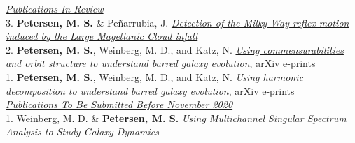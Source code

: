 \documentclass[margin, a4paper,11pt]{res} %
\begin{document}
\begin{resume}
\underline{\sl Publications In Review} \\
3. {\bf \textcolor{blueshade}{Petersen, M. S.}} \& Pe{\~n}arrubia, J.  \href{https://michael-petersen.github.io}{\it Detection of the Milky Way reflex motion induced by the Large Magellanic Cloud infall}\\
2. {\bf \textcolor{blueshade}{Petersen, M. S.}}, Weinberg, M. D., and Katz, N. \href{https://ui.adsabs.harvard.edu/abs/2019arXiv190205081P/abstract}{\it Using commensurabilities and orbit structure to understand barred galaxy evolution}, arXiv e-prints\\
1. {\bf \textcolor{blueshade}{Petersen, M. S.}}, Weinberg, M. D., and Katz, N. \href{https://ui.adsabs.harvard.edu/abs/2019arXiv190308203P/abstract}{\it Using harmonic decomposition to understand barred galaxy evolution}, arXiv e-prints\\

\underline{\sl Publications To Be Submitted Before November 2020} \\
1. Weinberg, M. D. \& {\bf \textcolor{blueshade}{Petersen, M. S.}} {\it Using Multichannel Singular Spectrum Analysis to Study
  Galaxy Dynamics} \\





\end{resume}
\end{document}
